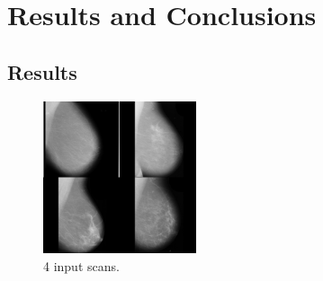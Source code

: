 \chapter{Results and Conclusions}




\section{Results}

\begin{figure}[H]
  \centering
  \includegraphics[width=0.4\textwidth]{Chapter3/results-img/big_scan.png}
  \caption{4 input scans.}
  \label{fig:input-data}
\end{figure}

